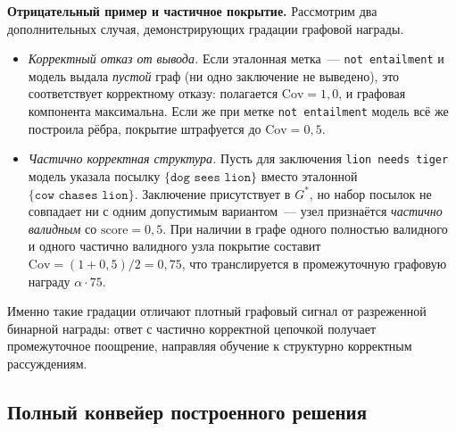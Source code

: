 \textbf{Отрицательный пример и частичное покрытие.} Рассмотрим два дополнительных случая, демонстрирующих градации графовой награды.
\begin{itemize}
    \setlength{\itemsep}{\smallskipamount}
    \item \textit{Корректный отказ от вывода.} Если эталонная метка~--- \texttt{not entailment} и модель выдала \emph{пустой} граф (ни одно заключение не выведено), это соответствует корректному отказу: полагается $\mathrm{Cov} = 1{,}0$, и графовая компонента максимальна. Если же при метке \texttt{not entailment} модель всё же построила рёбра, покрытие штрафуется до $\mathrm{Cov} = 0{,}5$.
    \item \textit{Частично корректная структура.} Пусть для заключения \texttt{lion needs tiger} модель указала посылку $\{\texttt{dog sees lion}\}$ вместо эталонной $\{\texttt{cow chases lion}\}$. Заключение присутствует в $G^*$, но набор посылок не совпадает ни с одним допустимым вариантом~--- узел признаётся \emph{частично валидным} со $\mathrm{score} = 0{,}5$. При наличии в графе одного полностью валидного и одного частично валидного узла покрытие составит $\mathrm{Cov} = (1 + 0{,}5)/2 = 0{,}75$, что транслируется в промежуточную графовую награду $\alpha \cdot 75$.
\end{itemize}
Именно такие градации отличают плотный графовый сигнал от разреженной бинарной награды: ответ с частично корректной цепочкой получает промежуточное поощрение, направляя обучение к структурно корректным рассуждениям.

\subsection{Полный конвейер построенного решения}
\label{subsec:overall-pipeline}

